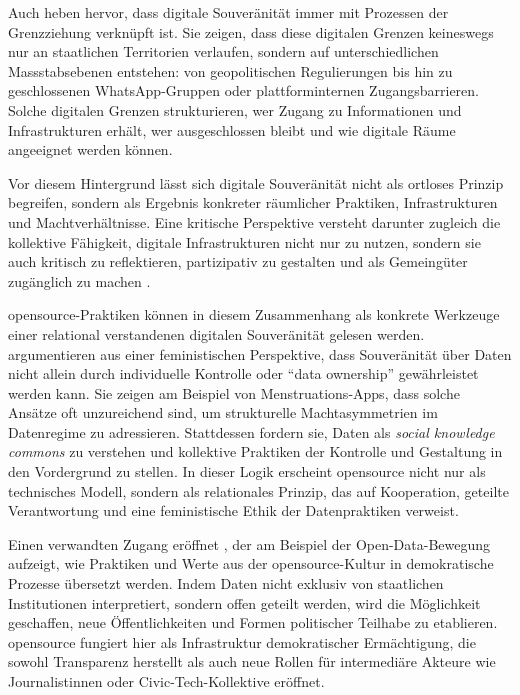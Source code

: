 Auch \textcite{zhangBordersBorderingSovereignty2023} heben hervor, dass digitale Souveränität immer mit Prozessen der Grenzziehung verknüpft ist. Sie zeigen, dass diese digitalen Grenzen keineswegs nur an staatlichen Territorien verlaufen, sondern auf unterschiedlichen Massstabsebenen entstehen: von geopolitischen Regulierungen bis hin zu geschlossenen WhatsApp-Gruppen oder plattforminternen Zugangsbarrieren. Solche digitalen Grenzen strukturieren, wer Zugang zu Informationen und Infrastrukturen erhält, wer ausgeschlossen bleibt und wie digitale Räume angeeignet werden können.

Vor diesem Hintergrund lässt sich digitale Souveränität nicht als ortloses Prinzip begreifen, sondern als Ergebnis konkreter räumlicher Praktiken, Infrastrukturen und Machtverhältnisse. Eine kritische Perspektive versteht darunter zugleich die kollektive Fähigkeit, digitale Infrastrukturen nicht nur zu nutzen, sondern sie auch kritisch zu reflektieren, partizipativ zu gestalten und als Gemeingüter zugänglich zu machen \parencite{baackDataficationEmpowermentHow2015}. 

\vspace{1em}

\gls{opensource}-Praktiken können in diesem Zusammenhang als konkrete Werkzeuge einer relational verstandenen digitalen Souveränität gelesen werden. \textcite{gurumurthyDataBodiesNew2022} argumentieren aus einer feministischen Perspektive, dass Souveränität über Daten nicht allein durch individuelle Kontrolle oder \enquote{data ownership} gewährleistet werden kann. Sie zeigen am Beispiel von Menstruations-Apps, dass solche Ansätze oft unzureichend sind, um strukturelle Machtasymmetrien im Datenregime zu adressieren. Stattdessen fordern sie, Daten als \emph{social knowledge commons} zu verstehen und kollektive Praktiken der Kontrolle und Gestaltung in den Vordergrund zu stellen. In dieser Logik erscheint \gls{opensource} nicht nur als technisches Modell, sondern als relationales Prinzip, das auf Kooperation, geteilte Verantwortung und eine feministische Ethik der Datenpraktiken verweist.

Einen verwandten Zugang eröffnet \textcite{baackDataficationEmpowermentHow2015}, der am Beispiel der Open-Data-Bewegung aufzeigt, wie Praktiken und Werte aus der \gls{opensource}-Kultur in demokratische Prozesse übersetzt werden. Indem Daten nicht exklusiv von staatlichen Institutionen interpretiert, sondern offen geteilt werden, wird die Möglichkeit geschaffen, neue Öffentlichkeiten und Formen politischer Teilhabe zu etablieren. \gls{opensource} fungiert hier als Infrastruktur demokratischer Ermächtigung, die sowohl Transparenz herstellt als auch neue Rollen für intermediäre Akteure wie Journalist\genderstern innen oder Civic-Tech-Kollektive eröffnet.

